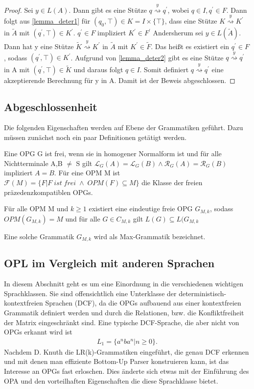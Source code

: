 \begin{proof}
Sei $y \in L(A)$. Dann gibt es eine Stütze $q \stackrel{y} {\rightsquigarrow} q^\prime$, wobei $q\in I, q^\prime \in F$. Dann folgt aus \autoref{lemma_deter1} für $(q_0, \top) \in K=I \times \{\top\}$, dass eine Stütze $K \stackrel{y}{\rightsquigarrow}K^\prime$ in $\tilde{A}$ mit $(q^\prime, \top) \in K^\prime $. $q^\prime \in F$ impliziert $K^\prime \in F^\prime$
Andersherum sei $y \in L(\tilde{A})$. Dann hat y eine Stütze $\tilde{K}\stackrel{y}{\rightsquigarrow}K^\prime$ in $\tilde{A}$ mit $K^\prime \in \tilde{F}$. Das heißt es existiert ein $q^\prime \in F$, sodass $(q^\prime, \top) \in K^\prime$. Aufgrund von \autoref{lemma_deter2} gibt es eine Stütze $q \stackrel{y} {\rightsquigarrow} q^\prime$ in A mit $(q^\prime, \top) \in \tilde{K}$ und daraus folgt $q \in I$. Somit definiert $q\stackrel{y}{\rightsquigarrow}q^\prime$ eine akzeptierende Berechnung für y in A.
Damit ist der Beweis abgeschlossen. 
\end{proof}
\subsection{Abgeschlossenheit}
Die folgenden Eigenschaften werden auf Ebene der Grammatiken geführt. Dazu müssen zunächst noch ein paar Definitionen getätigt werden.
\begin{definition}
Eine OPG G ist frei, wenn sie in homogener Normalform ist und für alle Nichtterminale A,B $\neq$ S gilt $\mathcal{L}_G(A) = \mathcal{L}_G(B) \wedge \mathcal{R}_G(A)=\mathcal{R}_G(B)$ impliziert $A=B$. Für eine OPM M ist $\mathcal{F}(M)=\{F|F \; ist \; frei \; \wedge \; OPM(F) \subseteq M\}$ die Klasse der freien präzedenzkompatiblen OPGs.
\end{definition}

\begin{lemma}
Für alle OPM M und $k \geq 1$ existiert eine eindeutige freie OPG $G_{M,k}$, sodass $OPM(G_{M,k})=M$ und für alle $G \in C_{M,k}$ gilt $L(G)\subseteq L(G_{M,k}$
\end{lemma}
Eine solche Grammatik $G_{M,k}$ wird als Max-Grammatik bezeichnet.

\subsection{OPL im Vergleich mit anderen Sprachen}
In diesem Abschnitt geht es um eine Einordnung in die verschiedenen wichtigen Sprachklassen. Sie sind offensichtlich eine Unterklasse der deterministisch-kontextfreien Sprachen (DCF), da die OPGs aufbauend aus einer kontextfreien Grammatik definiert werden und durch die Relationen, bzw. die Konfliktfreiheit der Matrix eingeschränkt sind. Eine typische DCF-Sprache, die aber nicht von OPGs erkannt wird ist
\begin{align*}
L_1=\{a^nba^n|n \geq 0 \}.
\end{align*}
Nachdem D. Knuth die LR(k)-Grammatiken eingeführt, die genau DCF erkennen und mit denen man effiziente Bottom-Up Parser konstruieren kann, ist das Interesse an OPGs fast erloschen. Dies änderte sich etwas mit der Einführung des OPA und den vorteilhaften Eigenschaften die diese Sprachklasse bietet.
